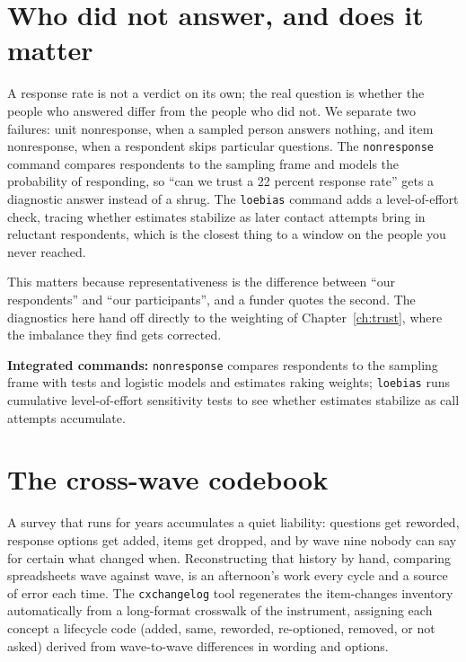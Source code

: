 \documentclass[
    a4paper,
    fontsize=10pt,
    twoside=true,
    numbers=noenddot,
]{kaobook}
\begin{document}
\section{Who did not answer, and does it matter}
A response rate is not a verdict on its own; the real question is whether the people who answered differ from the people who did not. We separate two failures: unit nonresponse, when a sampled person answers nothing, and item nonresponse, when a respondent skips particular questions. The \texttt{nonresponse} command compares respondents to the sampling frame and models the probability of responding, so \enquote{can we trust a 22 percent response rate} gets a diagnostic answer instead of a shrug. The \texttt{loebias} command adds a level-of-effort check, tracing whether estimates stabilize as later contact attempts bring in reluctant respondents, which is the closest thing to a window on the people you never reached.

This matters because representativeness is the difference between \enquote{our respondents} and \enquote{our participants}, and a funder quotes the second. The diagnostics here hand off directly to the weighting of Chapter~\ref{ch:trust}, where the imbalance they find gets corrected.

\begin{kaobox}[frametitle=Package Integration: \texttt{nonresponse} and \texttt{loebias}]
\textbf{Integrated commands:} \texttt{nonresponse} compares respondents to the sampling frame with tests and logistic models and estimates raking weights; \texttt{loebias} runs cumulative level-of-effort sensitivity tests to see whether estimates stabilize as call attempts accumulate.
\end{kaobox}

\section{The cross-wave codebook}\label{sec:cxchangelog}
A survey that runs for years accumulates a quiet liability: questions get reworded, response options get added, items get dropped, and by wave nine nobody can say for certain what changed when. Reconstructing that history by hand, comparing spreadsheets wave against wave, is an afternoon's work every cycle and a source of error each time. The \texttt{cxchangelog} tool regenerates the item-changes inventory automatically from a long-format crosswalk of the instrument, assigning each concept a lifecycle code (added, same, reworded, re-optioned, removed, or not asked) derived from wave-to-wave differences in wording and options.
\end{document}
